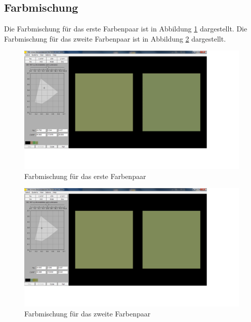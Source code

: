 \documentclass[a4paper]{article}
\begin{document}
\subsection{Farbmischung}
Die Farbmischung für das erste Farbenpaar ist in Abbildung \ref{fig:A6a} dargestellt. Die Farbmischung für das zweite Farbenpaar ist in Abbildung \ref{fig:A6b} dargestellt.
\begin{figure}[H]
    \centering
    \includegraphics[width=\textwidth]{images/A6_Farbpaar1.png}
    \caption{Farbmischung für das erste Farbenpaar}
    \label{fig:A6a}
\end{figure}
\begin{figure}[H]
    \centering
    \includegraphics[width=\textwidth]{images/A6_Farbpaar2.png}
    \caption{Farbmischung für das zweite Farbenpaar}
    \label{fig:A6b}
\end{figure}
\end{document}
